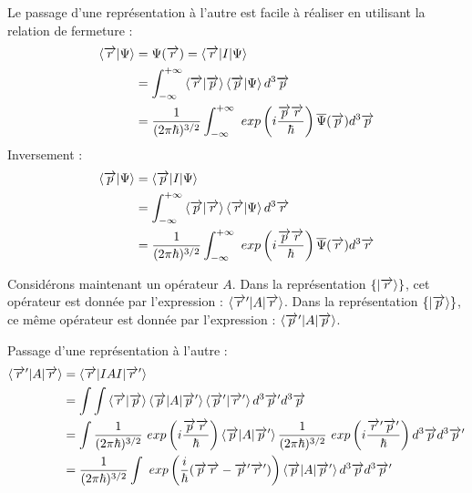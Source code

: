 \documentclass[12pt,a4paper,titlepage]{book}
\begin{document}
Le passage d'une représentation à l'autre est facile à réaliser en utilisant la relation de fermeture :
\begin{align*}
\braket{\overrightarrow{r} \vert \Psi} &= \Psi (\overrightarrow{r}) = \braket{\overrightarrow{r} \vert I \vert \Psi}\\
&= \int_{- \infty}^{+ \infty} \braket{\overrightarrow{r} \vert \overrightarrow{p}} \braket{\overrightarrow{p} \vert \Psi} d^3 \overrightarrow{p} \\
&= \frac{1}{(2 \pi \hbar)^{3/2}} \int_{- \infty}^{+ \infty} ~exp \left( i \frac{\overrightarrow{p} \overrightarrow{r}}{\hbar} \right) \overline{\Psi} (\overrightarrow{p}) d^3 \overrightarrow{p}
\end{align*}
Inversement :
\begin{align*}
\braket{\overrightarrow{p} \vert \Psi} &= \braket{\overrightarrow{p} \vert I \vert \Psi}\\
&= \int_{- \infty}^{+ \infty} \braket{\overrightarrow{p} \vert \overrightarrow{r}} \braket{\overrightarrow{r} \vert \Psi} d^3 \overrightarrow{r} \\
&= \frac{1}{(2 \pi \hbar)^{3/2}} \int_{- \infty}^{+ \infty} ~exp \left( i \frac{\overrightarrow{p} \overrightarrow{r}}{\hbar} \right) \overline{\Psi} (\overrightarrow{r}) d^3 \overrightarrow{r}
\end{align*}

Considérons maintenant un opérateur $A$. Dans la représentation $\lbrace \ket{\overrightarrow{r}} \rbrace$, cet opérateur est donnée par l'expression : $\braket{\overrightarrow{r}' \vert A \vert \overrightarrow{r}}$. Dans la représentation $\lbrace \ket{\overrightarrow{p}} \rbrace$, ce même opérateur est donnée par l'expression : $\braket{\overrightarrow{p}' \vert A \vert \overrightarrow{p}}$.

Passage d'une représentation à l'autre :
\begin{align*}
\braket{\overrightarrow{r}' \vert A \vert \overrightarrow{r}} &= \braket{\overrightarrow{r} \vert I A I \vert \overrightarrow{r}'}\\
&= \int \int \braket{\overrightarrow{r} \vert \overrightarrow{p}} \braket{\overrightarrow{p} \vert A \vert \overrightarrow{p}'} \braket{\overrightarrow{p}' \vert \overrightarrow{r}'} d^3 \overrightarrow{p}' d^3 \overrightarrow{p}\\
&= \int \frac{1}{(2 \pi \hbar)^{3/2}} ~exp \left( i \frac{\overrightarrow{p} \overrightarrow{r}}{\hbar} \right) \braket{\overrightarrow{p} \vert A \vert \overrightarrow{p}'} \frac{1}{(2 \pi \hbar)^{3/2}} ~exp \left( i \frac{\overrightarrow{r}' \overrightarrow{p}'}{\hbar} \right) d^3 \overrightarrow{p} d^3 \overrightarrow{p}'\\
&= \frac{1}{(2 \pi \hbar)^{3/2}} \int ~exp \left( \frac{i}{\hbar} (\overrightarrow{p} \overrightarrow{r} - \overrightarrow{p}' \overrightarrow{r}') \right) \braket{\overrightarrow{p} \vert A \vert \overrightarrow{p}'} d^3 \overrightarrow{p} d^3 \overrightarrow{p}'
\end{align*}
\end{document}
